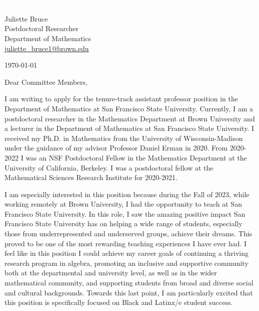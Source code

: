 \documentclass[11pt]{article}
\begin{document}
\section*{}

\noindent
\begin{minipage}{0.99\textwidth}
\begin{minipage}{0.69\textwidth}
\textcolor{white}{.}
\end{minipage}
\begin{minipage}{0.29\textwidth}
{
Juliette Bruce \\
Postdoctoral Researcher \\
Department of Mathematics \\
\href{mailto:juliette\_bruce1@brown.edu}{juliette\_bruce1@brown.edu}
}

\vspace{12pt}
\today
\end{minipage}
\end{minipage}


\vspace{12pt}
\noindent
Dear Committee Members,

I am writing to apply for the tenure-track assistant professor position in the Department of Mathematics at San Francisco State University. Currently, I am a postdoctoral researcher in the Mathematics Department at Brown University and a lecturer in the Department of Mathematics at San Francisco State University. I received my Ph.D. in Mathematics from the University of Wisconsin-Madison under the guidance of my advisor Professor Daniel Erman in 2020. From 2020-2022 I was an NSF Postdoctoral Fellow in the Mathematics Department at the University of California, Berkeley. I was a postdoctoral fellow at the Mathematical Sciences Research Institute for 2020-2021.

I am especially interested in this position because during the Fall of 2023, while working remotely at Brown University, I had the opportunity to teach at San Francisco State University.  In this role, I saw the amazing positive impact San Francisco State University has on helping a wide range of students, especially those from underrepresented and underserved groups, achieve their dreams. This proved to be one of the most rewarding teaching experiences I have ever had. I feel like in this position I could achieve my career goals of continuing a thriving research program in algebra, promoting an inclusive and supportive community both at the departmental and university level, as well as in the wider mathematical community, and supporting students from broad and diverse social and cultural backgrounds. Towards this last point, I am particularly excited that this position is specifically focused on Black and Latinx/e student success.  
\end{document}
